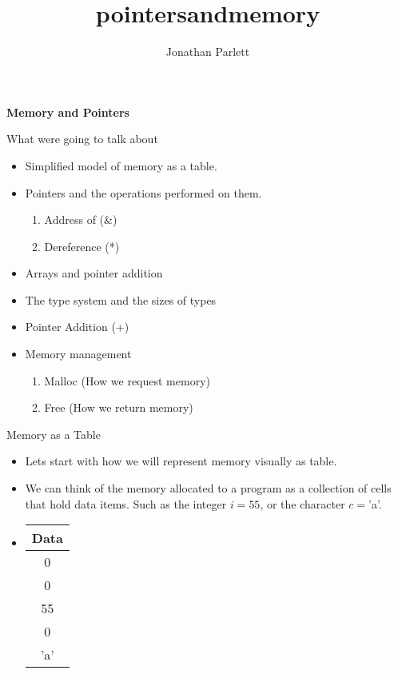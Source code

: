 \documentclass[10pt]{beamer}
\title{pointersandmemory}
\author{Jonathan Parlett}
\begin{document}
\begin{frame}
    \titlepage
	{\bf Memory and Pointers}
\end{frame}


\begin{frame}{What were going to talk about}
	\begin{itemize}[<+->]
		\item Simplified model of memory as a table.
		\item Pointers and the operations performed on them.
		\begin{enumerate}[<+->]
			\item Address of (\&)
			\item Dereference (*)
		\end{enumerate}
		\item Arrays and pointer addition
		\item The type system and the sizes of types
		\item Pointer Addition (+)
		\item Memory management
		\begin{enumerate}[<+->]
			\item Malloc (How we request memory)
			\item Free (How we return memory)
		\end{enumerate}
	\end{itemize}
\end{frame}

\begin{frame}{Memory as a Table}
\begin{itemize}[<+->]
	\item Lets start with how we will represent memory visually as table.
	\item We can think of the memory allocated to a program as a collection of cells that hold data items. Such as the integer $i = 55$, or the character $c =$'a'.
	\item 
	\begin{tabular}{|c|}
		\hline
		Data\\
		\hline
		0\\
		\hline
		0\\
		\hline
		55\\
		\hline
		0\\
		\hline
		'a'\\
		\hline
	\end{tabular}
\end{itemize}
\end{frame}
\end{document}
